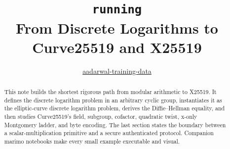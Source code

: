 

\title{\texttt{running}\\[0.25em]
\large From Discrete Logarithms to Curve25519 and X25519}
\author{\href{https://github.com/aadarwal-training-data}{aadarwal-training-data}}
\date{}


\maketitle

\begin{abstract}
This note builds the shortest rigorous path from modular arithmetic to X25519.
It defines the discrete logarithm problem in an arbitrary cyclic group,
instantiates it as the elliptic-curve discrete logarithm problem, derives the
Diffie--Hellman equality, and then studies Curve25519's field, subgroup,
cofactor, quadratic twist, x-only Montgomery ladder, and byte encoding. The
last section states the boundary between a scalar-multiplication primitive and
a secure authenticated protocol. Companion marimo notebooks make every small
example executable and visual.
\end{abstract}

\begin{center}
\end{center}

\tableofcontents













